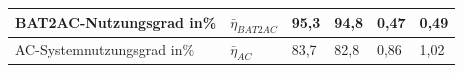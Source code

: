 \begin{table}[ht!]
\begin{tabular}{|l|l|l|l|l|l|}
    BAT2AC-Nutzungsgrad in\%                  &$\bar{\eta}_{BAT2AC}$               & 95,3                                              & 94,8                                  & 0,47                                         & 0,49                                    \\ \hline
   
    AC-Systemnutzungsgrad in\%                &$\bar{\eta}_{AC}$                   & 83,7                                              & 82,8                                  & 0,86                                         & 1,02                                    \\ \hline
 \end{tabular}
\end{table}
